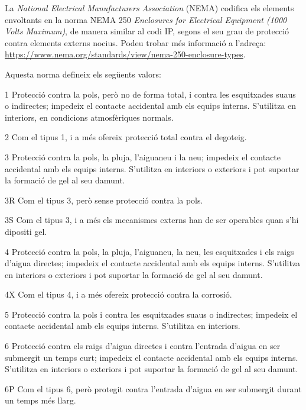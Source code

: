 La \textit{National Electrical Manufacturers Association} (NEMA)
codifica els elements envoltants en la norma NEMA 250 \textit{Enclosures for Electrical Equipment (1000 Volts Maximum)}, de manera similar al codi IP, segons el seu grau de protecció contra elements externs nocius. Podeu trobar més informació a l'adreça: \href{https://www.nema.org/standards/view/nema-250-enclosure-types}{https://www.nema.org/standards/view/nema-250-enclosure-types}.

Aquesta norma defineix els següents valors:

\begin{list}{}
   {\setlength{\labelwidth}{10mm} \setlength{\leftmargin}{15mm} \setlength{\labelsep}{5mm}}
   \item[1] Protecció contra la pols, però no de forma total, i contra les esquitxades suaus o indirectes; impedeix el contacte accidental amb els equips interns. S'utilitza en interiors, en condicions atmosfèriques normals.
   \item[2] Com el tipus 1, i a més ofereix protecció total contra el degoteig.
   \item[3] Protecció contra la pols, la pluja, l'aiguaneu i la neu; impedeix el contacte accidental amb els equips interns. S'utilitza en interiors o exteriors i pot suportar la formació de gel al seu damunt.
   \item[3R] Com el tipus 3, però sense protecció contra la pols.
   \item[3S] Com el tipus 3, i a més els mecanismes externs han de ser operables quan s'hi dipositi gel.
    \item[4] Protecció contra la pols, la pluja, l'aiguaneu, la neu, les esquitxades i els raigs d'aigua directes; impedeix el contacte accidental amb els equips interns. S'utilitza en interiors o exteriors i pot suportar la formació de gel al seu damunt.
   \item[4X] Com el tipus 4, i a més ofereix protecció contra la corrosió.
   \item[5] Protecció contra la pols i contra les esquitxades suaus o indirectes; impedeix el contacte accidental amb els equips interns. S'utilitza en interiors.
   \item[6] Protecció contra els raigs d'aigua directes i contra l'entrada d'aigua en ser submergit un temps curt; impedeix el contacte accidental amb els equips interns. S'utilitza en interiors o exteriors i pot suportar la formació de gel al seu damunt.
   \item[6P] Com el tipus 6, però protegit contra l'entrada d'aigua en ser submergit durant un temps més llarg.

\end{list}
